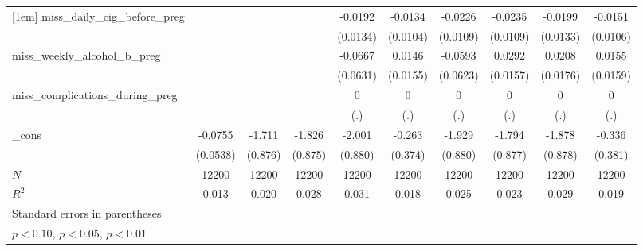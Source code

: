 \begin{table}[htbp]
\begin{tabular}{l*{9}{c}}
[1em]
miss\_daily\_cig\_before\_preg&                     &                     &                     &     -0.0192         &     -0.0134         &     -0.0226\sym{**} &     -0.0235\sym{**} &     -0.0199         &     -0.0151         \\
            &                     &                     &                     &    (0.0134)         &    (0.0104)         &    (0.0109)         &    (0.0109)         &    (0.0133)         &    (0.0106)         \\
[1em]
miss\_weekly\_alcohol\_b\_preg&                     &                     &                     &     -0.0667         &      0.0146         &     -0.0593         &      0.0292\sym{*}  &      0.0208         &      0.0155         \\
            &                     &                     &                     &    (0.0631)         &    (0.0155)         &    (0.0623)         &    (0.0157)         &    (0.0176)         &    (0.0159)         \\
[1em]
miss\_complications\_during\_preg&                     &                     &                     &           0         &           0         &           0         &           0         &           0         &           0         \\
            &                     &                     &                     &         (.)         &         (.)         &         (.)         &         (.)         &         (.)         &         (.)         \\
[1em]
\_cons      &     -0.0755         &      -1.711\sym{*}  &      -1.826\sym{**} &      -2.001\sym{**} &      -0.263         &      -1.929\sym{**} &      -1.794\sym{**} &      -1.878\sym{**} &      -0.336         \\
            &    (0.0538)         &     (0.876)         &     (0.875)         &     (0.880)         &     (0.374)         &     (0.880)         &     (0.877)         &     (0.878)         &     (0.381)         \\
\hline
\(N\)       &       12200         &       12200         &       12200         &       12200         &       12200         &       12200         &       12200         &       12200         &       12200         \\
\(R^{2}\)   &       0.013         &       0.020         &       0.028         &       0.031         &       0.018         &       0.025         &       0.023         &       0.029         &       0.019         \\
\hline\hline
\multicolumn{10}{l}{\footnotesize Standard errors in parentheses}\\
\multicolumn{10}{l}{\footnotesize \sym{*} \(p<0.10\), \sym{**} \(p<0.05\), \sym{***} \(p<0.01\)}\\
\end{tabular}
\end{table}
